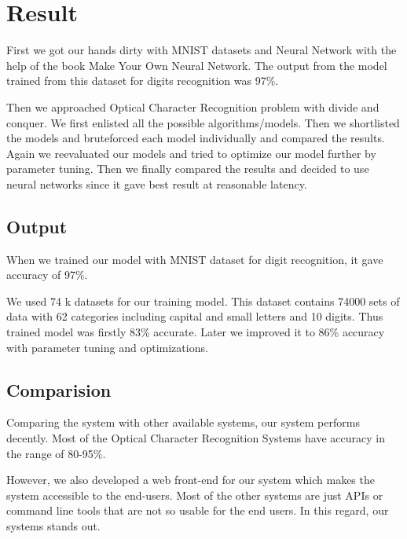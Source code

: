 \chapter{Result}
First we got our hands dirty with MNIST datasets and Neural Network with the help of the book Make Your Own Neural Network\cite{make_own}. The output from the model trained from this dataset for digits recognition was 97\%.

Then we approached Optical Character Recognition problem with divide and conquer. We first enlisted all the possible algorithms/models. Then we shortlisted the models and bruteforced each model individually and compared the results. Again we reevaluated our models and tried to optimize our model further by parameter tuning. Then we finally compared the results and decided to use neural networks since it gave best result at reasonable latency.

\section{Output}
When we trained our model with MNIST dataset for digit recognition, it gave accuracy of 97\%. 

We used 74 k datasets for our training model. This dataset contains 74000 sets of data with 62 categories including capital and small letters and 10 digits. Thus trained model was firstly 83\% accurate. Later we improved it to 86\% accuracy with parameter tuning and optimizations.

\section{Comparision}
Comparing the system with other available systems, our system performs decently. Most of the Optical Character Recognition Systems have accuracy in the range of 80-95\%. 

However, we also developed a web front-end for our system which makes the system accessible to the end-users. Most of the other systems are just APIs or command line tools that are not so usable for the end users. In this regard, our systems stands out.
